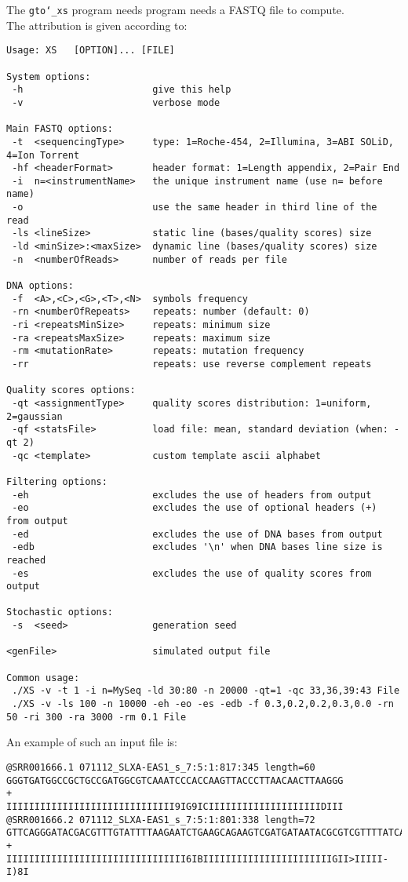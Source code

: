 The \texttt{gto\char`_xs} program needs program needs a FASTQ file to compute.\\
The attribution is given according to:
\begin{lstlisting}
Usage: XS   [OPTION]... [FILE] 

System options:
 -h                       give this help
 -v                       verbose mode

Main FASTQ options:
 -t  <sequencingType>     type: 1=Roche-454, 2=Illumina, 3=ABI SOLiD, 4=Ion Torrent
 -hf <headerFormat>       header format: 1=Length appendix, 2=Pair End
 -i  n=<instrumentName>   the unique instrument name (use n= before name)
 -o                       use the same header in third line of the read
 -ls <lineSize>           static line (bases/quality scores) size
 -ld <minSize>:<maxSize>  dynamic line (bases/quality scores) size
 -n  <numberOfReads>      number of reads per file

DNA options:
 -f  <A>,<C>,<G>,<T>,<N>  symbols frequency
 -rn <numberOfRepeats>    repeats: number (default: 0)
 -ri <repeatsMinSize>     repeats: minimum size
 -ra <repeatsMaxSize>     repeats: maximum size
 -rm <mutationRate>       repeats: mutation frequency
 -rr                      repeats: use reverse complement repeats

Quality scores options:
 -qt <assignmentType>     quality scores distribution: 1=uniform, 2=gaussian
 -qf <statsFile>          load file: mean, standard deviation (when: -qt 2)
 -qc <template>           custom template ascii alphabet

Filtering options:
 -eh                      excludes the use of headers from output
 -eo                      excludes the use of optional headers (+) from output
 -ed                      excludes the use of DNA bases from output
 -edb                     excludes '\n' when DNA bases line size is reached
 -es                      excludes the use of quality scores from output

Stochastic options:
 -s  <seed>               generation seed

<genFile>                 simulated output file

Common usage:
 ./XS -v -t 1 -i n=MySeq -ld 30:80 -n 20000 -qt=1 -qc 33,36,39:43 File
 ./XS -v -ls 100 -n 10000 -eh -eo -es -edb -f 0.3,0.2,0.2,0.3,0.0 -rn 50 -ri 300 -ra 3000 -rm 0.1 File
\end{lstlisting}
An example of such an input file is:
\begin{lstlisting}
@SRR001666.1 071112_SLXA-EAS1_s_7:5:1:817:345 length=60
GGGTGATGGCCGCTGCCGATGGCGTCAAATCCCACCAAGTTACCCTTAACAACTTAAGGG
+
IIIIIIIIIIIIIIIIIIIIIIIIIIIIII9IG9ICIIIIIIIIIIIIIIIIIIIIDIII
@SRR001666.2 071112_SLXA-EAS1_s_7:5:1:801:338 length=72
GTTCAGGGATACGACGTTTGTATTTTAAGAATCTGAAGCAGAAGTCGATGATAATACGCGTCGTTTTATCAT
+
IIIIIIIIIIIIIIIIIIIIIIIIIIIIIIII6IBIIIIIIIIIIIIIIIIIIIIIIIGII>IIIII-I)8I
\end{lstlisting}

